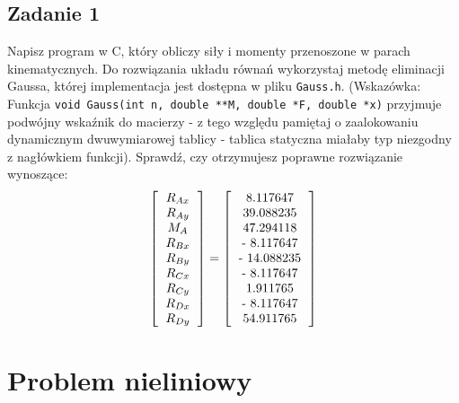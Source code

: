 \documentclass{instrukcja}
\begin{document}
\subsection*{Zadanie 1}
Napisz program w C, który obliczy siły i momenty przenoszone w parach kinematycznych. Do rozwiązania układu równań wykorzystaj metodę eliminacji Gaussa, której implementacja jest dostępna w pliku {\tt Gauss.h}. (Wskazówka: Funkcja {\tt void Gauss(int n, double **M, double *F, double *x)} przyjmuje podwójny wskaźnik do macierzy - z tego względu pamiętaj o zaalokowaniu dynamicznym dwuwymiarowej tablicy - tablica statyczna miałaby typ niezgodny z nagłówkiem funkcji). Sprawdź, czy otrzymujesz poprawne rozwiązanie wynoszące:
\begin{displaymath}
\left[ \begin{tabular}{c} $R_{Ax}$ \\
$R_{Ay}$ \\
$M_A$ \\
$R_{Bx}$ \\
$R_{By}$ \\
$R_{Cx}$ \\
$R_{Cy}$ \\
$R_{Dx}$ \\
$R_{Dy}$ \\
\end{tabular} \right] = \left[
\begin{tabular}{c} 8.117647 \\
		39.088235 \\
		47.294118 \\
		- 8.117647 \\
		- 14.088235 \\
		- 8.117647 \\
		1.911765 \\
		- 8.117647 \\
		54.911765 \\ \end{tabular} \right]
\end{displaymath}

\section{Problem nieliniowy}
\end{document}
